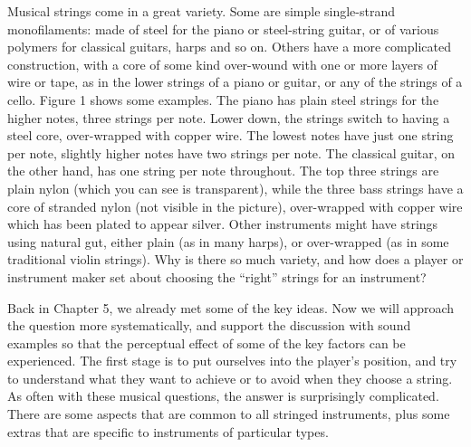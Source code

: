 

  Musical strings come in a great variety. Some are simple single-strand 
  monofilaments: made of steel for the piano or steel-string guitar, or of 
  various polymers for classical guitars, harps and so on. Others have a more 
  complicated construction, with a core of some kind over-wound with one or 
  more layers of wire or tape, as in the lower strings of a piano or guitar, or 
  any of the strings of a cello. Figure 1 shows some examples. The piano has 
  plain steel strings for the higher notes, three strings per note. Lower down, 
  the strings switch to having a steel core, over-wrapped with copper wire. The 
  lowest notes have just one string per note, slightly higher notes have two 
  strings per note. The classical guitar, on the other hand, has one string per 
  note throughout. The top three strings are plain nylon (which you can see is 
  transparent), while the three bass strings have a core of stranded nylon (not 
  visible in the picture), over-wrapped with copper wire which has been plated 
  to appear silver. Other instruments might have strings using natural gut, 
  either plain (as in many harps), or over-wrapped (as in some traditional 
  violin strings). Why is there so much variety, and how does a player or 
  instrument maker set about choosing the “right” strings for an instrument? 

  

  

  Back in Chapter 5, we already met some of the key ideas. Now we will approach 
  the question more systematically, and support the discussion with sound 
  examples so that the perceptual effect of some of the key factors can be 
  experienced. The first stage is to put ourselves into the player’s position, 
  and try to understand what they want to achieve or to avoid when they choose 
  a string. As often with these musical questions, the answer is surprisingly 
  complicated. There are some aspects that are common to all stringed 
  instruments, plus some extras that are specific to instruments of particular 
  types. 

